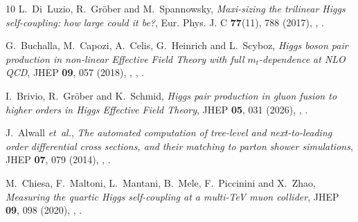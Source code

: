 \documentclass{SciPost}
\begin{document}
\begin{thebibliography}{10}
L.~Di~Luzio, R.~Gr\"ober and M.~Spannowsky,
\newblock \emph{{Maxi-sizing the trilinear Higgs self-coupling: how large could it be?}},
\newblock Eur. Phys. J. C \textbf{77}(11), 788 (2017),
\newblock {},
\newblock {}.

G.~Buchalla, M.~Capozi, A.~Celis, G.~Heinrich and L.~Scyboz,
\newblock \emph{{Higgs boson pair production in non-linear Effective Field Theory with full $m_t$-dependence at NLO QCD}},
\newblock JHEP \textbf{09}, 057 (2018),
\newblock {},
,
\newblock {}.

I.~Brivio, R.~Gr{\"o}ber and K.~Schmid,
\newblock \emph{{Higgs pair production in gluon fusion to higher orders in Higgs Effective Field Theory}},
\newblock JHEP \textbf{05}, 031 (2026),
\newblock {},
\newblock {}.

J.~Alwall \emph{et~al.},
\newblock \emph{{The automated computation of tree-level and next-to-leading order differential cross sections, and their matching to parton shower simulations}},
\newblock JHEP \textbf{07}, 079 (2014),
\newblock {},
\newblock {}.

M.~Chiesa, F.~Maltoni, L.~Mantani, B.~Mele, F.~Piccinini and X.~Zhao,
\newblock \emph{{Measuring the quartic Higgs self-coupling at a multi-TeV muon collider}},
\newblock JHEP \textbf{09}, 098 (2020),
\newblock {},
\newblock {}.

\end{thebibliography}
\end{document}

